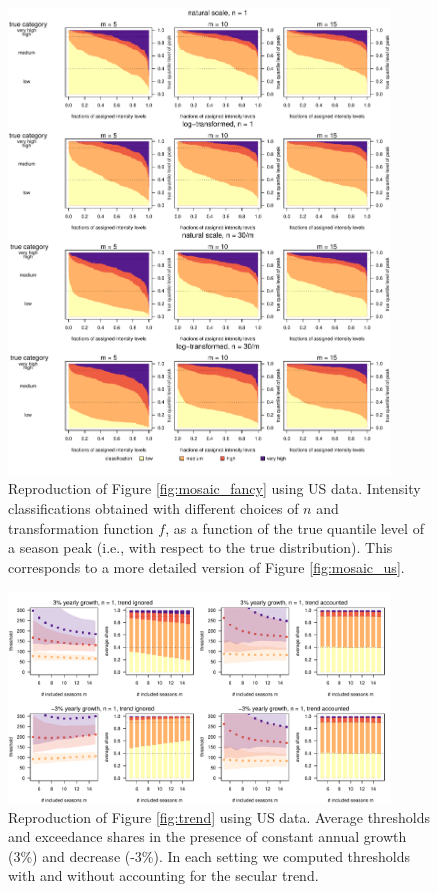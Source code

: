 \documentclass[12pt]{article}
\begin{document}
\newpage

\begin{figure}[h!]
\includegraphics[width=0.9\textwidth]{figure/mosaic_fr_fancy.pdf}
\caption{Reproduction of Figure \ref{fig:mosaic_fancy} using US data. Intensity classifications obtained with different choices of $n$ and transformation function $f$, as a function of the true quantile level of a season peak (i.e., with respect to the true distribution). This corresponds to a more detailed version of Figure \ref{fig:mosaic_us}.}
\label{fig:mosaic_fancy_us}
\end{figure}

\newpage


\begin{figure}
\begin{center}
\includegraphics[width = 0.9\textwidth]{figure/plot_trend3_us_small.pdf}
\end{center}
\caption{Reproduction of Figure \ref{fig:trend} using US data. Average thresholds and exceedance shares in the presence of constant annual growth (3\%) and decrease (-3\%). In each setting we computed thresholds with and without accounting for the secular trend.}
\label{fig:trend_us}
\end{figure}
\end{document}
